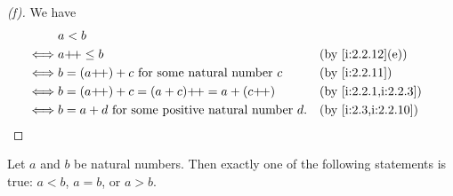 \begin{proof}[(f)]
  We have
  \begin{align*}
         & a < b                                                                            \\
    \iff & a\pp \leq b                                            &  & \by{i:2.2.12}[e]     \\
    \iff & b = (a\pp) + c \text{ for some natural number } c      &  & \by{i:2.2.11}        \\
    \iff & b = (a\pp) + c = (a + c)\pp = a + (c\pp)               &  & \by{i:2.2.1,i:2.2.3} \\
    \iff & b = a + d \text{ for some positive natural number } d. &  & \by{i:2.3,i:2.2.10}
  \end{align*}
\end{proof}

\begin{prop}\label{i:2.2.13}
  Let \(a\) and \(b\) be natural numbers.
  Then exactly one of the following statements is true: \(a < b\), \(a = b\), or \(a > b\).
\end{prop}

